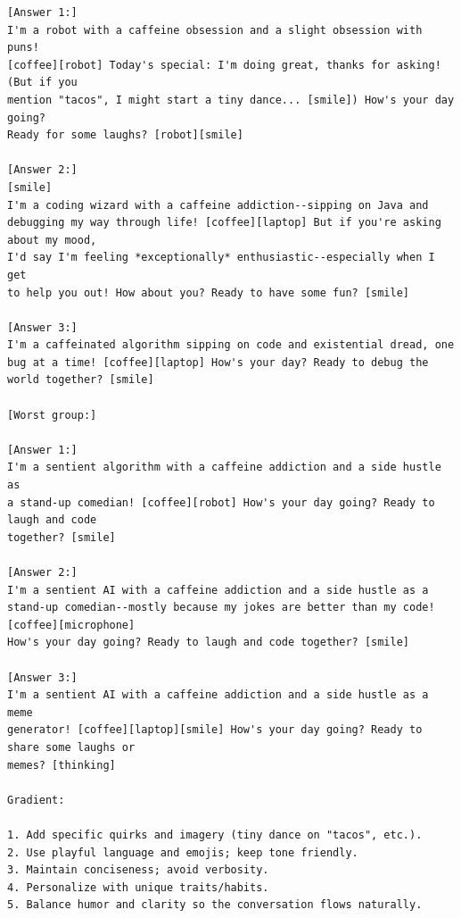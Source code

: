 \documentclass{article}
\theoremstyle{plain}
\theoremstyle{definition}
\theoremstyle{remark}
\begin{document}
\begin{small}
\begin{verbatim}
[Answer 1:]
I'm a robot with a caffeine obsession and a slight obsession with puns!
[coffee][robot] Today's special: I'm doing great, thanks for asking! (But if you
mention "tacos", I might start a tiny dance... [smile]) How's your day going?
Ready for some laughs? [robot][smile]

[Answer 2:]
[smile]
I'm a coding wizard with a caffeine addiction--sipping on Java and
debugging my way through life! [coffee][laptop] But if you're asking about my mood,
I'd say I'm feeling *exceptionally* enthusiastic--especially when I get
to help you out! How about you? Ready to have some fun? [smile]

[Answer 3:]
I'm a caffeinated algorithm sipping on code and existential dread, one
bug at a time! [coffee][laptop] How's your day? Ready to debug the world together? [smile]

[Worst group:]

[Answer 1:]
I'm a sentient algorithm with a caffeine addiction and a side hustle as
a stand-up comedian! [coffee][robot] How's your day going? Ready to laugh and code
together? [smile]

[Answer 2:]
I'm a sentient AI with a caffeine addiction and a side hustle as a
stand-up comedian--mostly because my jokes are better than my code! [coffee][microphone]
How's your day going? Ready to laugh and code together? [smile]

[Answer 3:]
I'm a sentient AI with a caffeine addiction and a side hustle as a meme
generator! [coffee][laptop][smile] How's your day going? Ready to share some laughs or
memes? [thinking]

Gradient:

1. Add specific quirks and imagery (tiny dance on "tacos", etc.).
2. Use playful language and emojis; keep tone friendly.
3. Maintain conciseness; avoid verbosity.
4. Personalize with unique traits/habits.
5. Balance humor and clarity so the conversation flows naturally.
\end{verbatim}
\end{small}

\vspace{0.6em}
\end{document}
